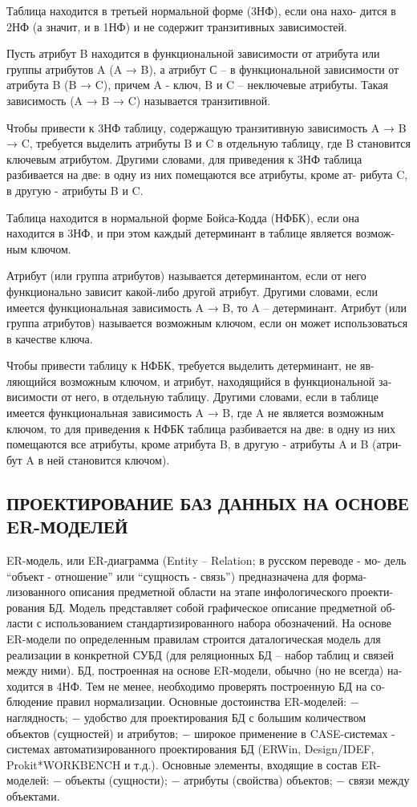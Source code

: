 {Таблица находится в третьей нормальной форме (3НФ), если она нахо-
дится в 2НФ (а значит, и в 1НФ) и не содержит транзитивных зависимостей.

Пусть атрибут B находится в функциональной зависимости от атрибута
или группы атрибутов A (A → B), а атрибут С – в функциональной зависимости
от атрибута B (B → C), причем A - ключ, B и C – неключевые атрибуты. Такая
зависимость (A → B → C) называется транзитивной.

Чтобы привести к 3НФ таблицу, содержащую транзитивную зависимость
A → B → C, требуется выделить атрибуты B и C в отдельную таблицу, где B
становится ключевым атрибутом. Другими словами, для приведения к 3НФ
таблица разбивается на две: в одну из них помещаются все атрибуты, кроме ат-
рибута C, в другую - атрибуты B и C.

Таблица находится в нормальной форме Бойса-Кодда (НФБК), если она
находится в 3НФ, и при этом каждый детерминант в таблице является возмож-
ным ключом.

Атрибут (или группа атрибутов) называется детерминантом, если от него
функционально зависит какой-либо другой атрибут. Другими словами, если
имеется функциональная зависимость A → B, то A – детерминант.
Атрибут (или группа атрибутов) называется возможным ключом, если он
может использоваться в качестве ключа.

Чтобы привести таблицу к НФБК, требуется выделить детерминант, не яв-
ляющийся возможным ключом, и атрибут, находящийся в функциональной за-
висимости от него, в отдельную таблицу. Другими словами, если в таблице
имеется функциональная зависимость A → B, где A не является возможным
ключом, то для приведения к НФБК таблица разбивается на две: в одну из них
помещаются все атрибуты, кроме атрибута B, в другую - атрибуты A и B (атри-
бут A в ней становится ключом).

\subsection{ПРОЕКТИРОВАНИЕ БАЗ ДАННЫХ НА ОСНОВЕ ER-МОДЕЛЕЙ}

ER-модель, или ER-диаграмма (Entity – Relation; в русском переводе - мо-
дель “объект - отношение” или “сущность - связь”) предназначена для форма-
лизованного описания предметной области на этапе инфологического проекти-
рования БД. Модель представляет собой графическое описание предметной об-
ласти с использованием стандартизированного набора обозначений. На основе
ER-модели по определенным правилам строится даталогическая модель для
реализации в конкретной СУБД (для реляционных БД – набор таблиц и связей
между ними). БД, построенная на основе ER-модели, обычно (но не всегда) на-
ходится в 4НФ. Тем не менее, необходимо проверять построенную БД на со-
блюдение правил нормализации.
Основные достоинства ER-моделей:
− наглядность;
− удобство для проектирования БД с большим количеством объектов
(сущностей) и атрибутов;
− широкое применение в CASE-системах - системах автоматизированного
проектирования БД (ERWin, Design/IDEF, Prokit*WORKBENCH и т.д.).
Основные элементы, входящие в состав ER-моделей:
− объекты (сущности);
− атрибуты (свойства) объектов;
− связи между объектами.

}

